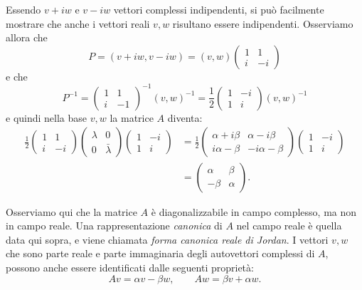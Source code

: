 \documentclass[italian,a4paper]{scrartcl}
\begin{document}
Essendo $v+iw$ e $v-iw$ vettori complessi indipendenti, si può
facilmente mostrare che anche i vettori reali $v,w$ risultano essere
indipendenti. Osserviamo allora che
\[
 P = (v+iw, v-iw) = (v,w)\begin{pmatrix}1 & 1\\ i & -i\end{pmatrix}
\]
e che
\[
  P^{-1} = \begin{pmatrix}1 & 1\\ i & -1\end{pmatrix}^{-1}(v,w)^{-1}
         = \frac 1 2 \begin{pmatrix}1 & -i\\ 1 & i\end{pmatrix}(v,w)^{-1}
\]
e quindi nella base $v,w$ la matrice $A$ diventa:
\begin{align*}
\frac 1 2
\begin{pmatrix}1 & 1\\ i & -i\end{pmatrix}
\begin{pmatrix}\lambda & 0 \\ 0 & \bar \lambda\end{pmatrix}
\begin{pmatrix}1 & -i\\ 1 & i\end{pmatrix}
&=
\frac 1 2
\begin{pmatrix}\alpha+i\beta & \alpha-i\beta \\i\alpha-\beta  &
  -i\alpha-\beta\end{pmatrix}
\begin{pmatrix}1 & -i\\ 1 & i\end{pmatrix}\\
&=
\begin{pmatrix}\alpha & \beta \\-\beta  & \alpha\end{pmatrix}.
\end{align*}

Osserviamo qui che la matrice $A$ è diagonalizzabile in campo
complesso, ma non in campo reale. Una rappresentazione \emph{canonica}
di $A$ nel campo reale è quella data qui sopra, e viene chiamata
\emph{forma canonica reale di Jordan}. I vettori $v,w$ che sono parte reale
e parte immaginaria degli autovettori complessi di $A$, possono anche
essere identificati dalle seguenti proprietà:
\[
  Av = \alpha v - \beta w,\qquad Aw = \beta v + \alpha w.
\]
\end{document}
